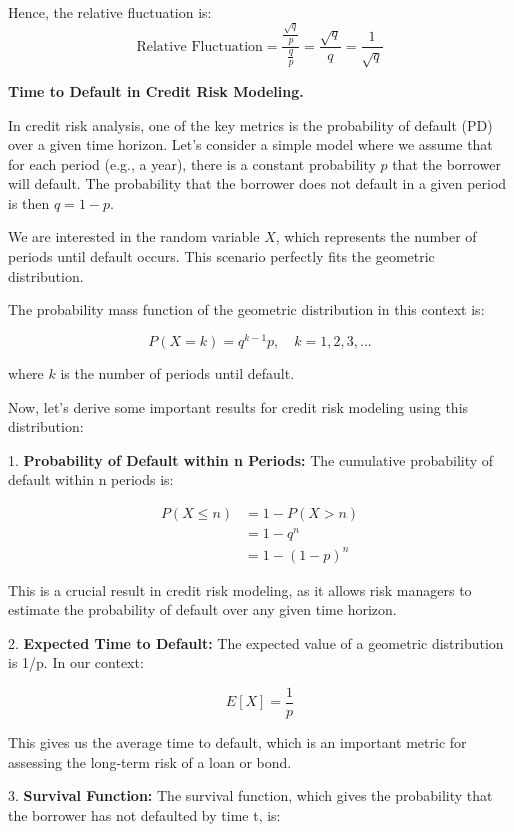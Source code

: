 Hence, the relative fluctuation is:
\[
    \text{Relative Fluctuation} = \frac{\frac{\sqrt{q}}{p}}{\frac{q}{p}} = \frac{\sqrt{q}}{q} = \frac{1}{\sqrt{q}}
\]

\begin{example}
    \textbf{Time to Default in Credit Risk Modeling.}

    In credit risk analysis, one of the key metrics is the probability of default (PD) over a given time horizon. Let's consider a simple model where we assume that for each period (e.g., a year), there is a constant probability $p$ that the borrower will default. The probability that the borrower does not default in a given period is then $q = 1 - p$.

    We are interested in the random variable $X$, which represents the number of periods until default occurs. This scenario perfectly fits the geometric distribution.

    The probability mass function of the geometric distribution in this context is:

    \[
        P(X = k) = q^{k-1}p, \quad k = 1, 2, 3, ...
    \]

    where $k$ is the number of periods until default.

    Now, let's derive some important results for credit risk modeling using this distribution:

    1. \textbf{Probability of Default within n Periods:}
    The cumulative probability of default within n periods is:

    \begin{align*}
        P(X \leq n) & = 1 - P(X > n) \\
                    & = 1 - q^n      \\
                    & = 1 - (1-p)^n
    \end{align*}

    This is a crucial result in credit risk modeling, as it allows risk managers to estimate the probability of default over any given time horizon.

    2. \textbf{Expected Time to Default:}
    The expected value of a geometric distribution is 1/p. In our context:

    \[
        E[X] = \frac{1}{p}
    \]

    This gives us the average time to default, which is an important metric for assessing the long-term risk of a loan or bond.

    3. \textbf{Survival Function:}
    The survival function, which gives the probability that the borrower has not defaulted by time t, is:


\end{example}
